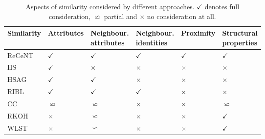 \begin{table}
    \centering
    
    \caption{Aspects of similarity considered by different approaches. $\checkmark$ denotes full consideration, $\backsimeq$ partial and $\times$ no consideration at all.  }
    \label{tab:Props}
    \begin{tabular}{@{}llllll@{}}
        \toprule
        \textbf{Similarity}  & {\footnotesize\textbf{Attributes}} & \makecell{\footnotesize\textbf{Neighbour.} \\ \footnotesize\textbf{attributes}} & \makecell{\footnotesize\textbf{Neighbour.} \\ \footnotesize\textbf{identities}}  & {\footnotesize\textbf{Proximity}} & \makecell{\footnotesize\textbf{Structural} \\ \footnotesize\textbf{properties}}    \\
        \midrule
         ReCeNT                & $\checkmark$        & $\checkmark$                      & $\checkmark$                        & $\checkmark$       & $\checkmark$ \\
         
         HS                  & $\checkmark$        & $\times$                          & $\times$                            & $\times$           & $\times$   \\
         
         HSAG                & $\checkmark$        & $\checkmark$                      & $\times$                            & $\times$           & $\times$   \\
         
         RIBL                & $\checkmark$        & $\checkmark$                      & $\checkmark$                        & $\times$           & $\times$  \\
         
         CC                  & $\backsimeq$        & $\backsimeq$                      & $\times$                            & $\times$           & $\backsimeq$   \\
         
         RKOH                & $\times$            & $\backsimeq$                      & $\times$                            & $\times$           & $\checkmark$ \\
         
         WLST                & $\times$            & $\backsimeq$                      & $\times$                            & $\times$           & $\checkmark$ \\
         \bottomrule
    \end{tabular}
    
\end{table}


